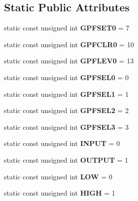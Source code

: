 \subsection*{Static Public Attributes}
\begin{DoxyCompactItemize}
\item 
\mbox{\label{classmmap_gpio_afc23a6edf4604088c4695a8dd0f17f58}} 
static const unsigned int {\bfseries G\+P\+F\+S\+E\+T0} = 7
\item 
\mbox{\label{classmmap_gpio_a0f3607e4370dd0749d6260aa56191297}} 
static const unsigned int {\bfseries G\+P\+F\+C\+L\+R0} = 10
\item 
\mbox{\label{classmmap_gpio_ac809e121dece69f21a78264e03f33fdf}} 
static const unsigned int {\bfseries G\+P\+F\+L\+E\+V0} = 13
\item 
\mbox{\label{classmmap_gpio_ab68a2d730e1e00d8f4bcda486f2ebeb5}} 
static const unsigned int {\bfseries G\+P\+F\+S\+E\+L0} = 0
\item 
\mbox{\label{classmmap_gpio_a3f33beb144c0bdb1664462c5818537ec}} 
static const unsigned int {\bfseries G\+P\+F\+S\+E\+L1} = 1
\item 
\mbox{\label{classmmap_gpio_ae4414301afa3c18960489f078b2c247d}} 
static const unsigned int {\bfseries G\+P\+F\+S\+E\+L2} = 2
\item 
\mbox{\label{classmmap_gpio_a9761525ad19e3e67a50b8249f2736939}} 
static const unsigned int {\bfseries G\+P\+F\+S\+E\+L3} = 3
\item 
\mbox{\label{classmmap_gpio_a54b30a1efc55f5cc4b5d525e915acffb}} 
static const unsigned int {\bfseries I\+N\+P\+UT} = 0
\item 
\mbox{\label{classmmap_gpio_ac11f5bc14d4420c1f1cf3a167682a6dd}} 
static const unsigned int {\bfseries O\+U\+T\+P\+UT} = 1
\item 
\mbox{\label{classmmap_gpio_a0a56c0afdc3f03745a08d75807b234d8}} 
static const unsigned int {\bfseries L\+OW} = 0
\item 
\mbox{\label{classmmap_gpio_a8c0d8a9b44cdecc734a12b0122aa2799}} 
static const unsigned int {\bfseries H\+I\+GH} = 1
\end{DoxyCompactItemize}



